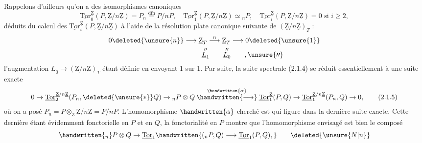 Rappelons d'ailleurs qu'on a des isomorphismes canoniques
\[ \underline{\mathrm{Tor}}^{\underline{\mathrm Z}}_0(P,\underline{\mathrm Z}/n\underline{\mathrm Z})=P_n\mathrel{\overset{\mathrm{dfn}}{=}}P/nP,\quad \underline{\mathrm{Tor}}^{\underline{\mathrm Z}}_1(P,\underline{\mathrm Z}/n\underline{\mathrm Z})\simeq {}_nP,\quad \underline{\mathrm{Tor}}^{\underline{\mathrm Z}}_i(P,\underline{\mathrm Z}/n\underline{\mathrm Z})=0\text{ si }i\geq2, \]
déduits du calcul des $\underline{\mathrm{Tor}}^{\underline{\mathrm Z}}_i(P,\underline{\mathrm Z}/n\underline{\mathrm Z})$ à l'aide de la résolution plate canonique suivante de $(\underline{\mathrm Z}/n\underline{\mathrm Z})_T$ :
\[ \begin{aligned}0\deleted{\unsure{n}}&\longrightarrow\underline{\mathrm Z}_T\overset{n}{\longrightarrow}\underline{\mathrm Z}_T\longrightarrow 0\deleted{\unsure{1}}\\ &\hspace{2.6em}\overset{\prime\prime}{\underline L_1}\qquad\overset{\prime\prime}{\underline L_0}\qquad,\unsure{\prime\prime}\end{aligned} \]
l'augmentation $\underline L_0\to(\underline{\mathrm Z}/n\underline{\mathrm Z})_T$ étant définie en envoyant 1 sur 1. Par suite, la suite spectrale (2.1.4) se réduit essentiellement à une suite exacte
\[ 0\to\underline{\mathrm{Tor}}^{\underline{\mathrm Z}/n\underline{\mathrm Z}}_2(P_n,\deleted{\unsure{*}}Q)\to{}_nP\otimes Q\mathbin{\overset{\handwritten{\alpha}}{\handwritten{\longrightarrow}}}\underline{\mathrm{Tor}}^{\underline{\mathrm Z}}_1(P,Q)\to\underline{\mathrm{Tor}}^{\underline{\mathrm Z}/n\underline{\mathrm Z}}_1(P_n,Q)\to0,\tag*{(2.1.5)} \]
où on a posé $P_n=P\otimes_{\underline{\mathrm Z}}\underline{\mathrm Z}/n\underline{\mathrm Z}=P/nP$. L'homomorphisme $\handwritten{\alpha}$  cherché est   qui figure dans la dernière suite exacte. Cette dernière étant évidemment fonctorielle en $P$ et en $Q$, la fonctorialité en $P$ montre que l'homomorphisme envisagé est bien le composé
\[ \handwritten{{}_n}P\otimes Q\to\underline{\mathrm{Tor}}_1\handwritten{({}_nP,Q)\longrightarrow\underline{\mathrm{Tor}}_1(P,Q),}\qquad\deleted{\unsure{N|n}} \]
